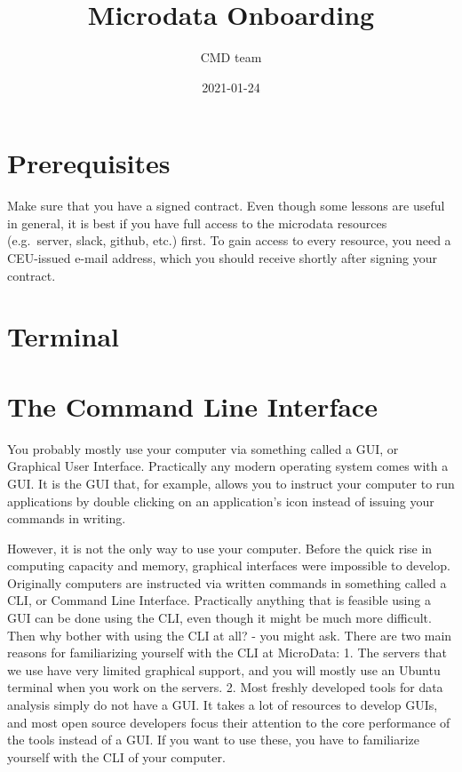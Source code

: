\documentclass[
]{book}
\title{Microdata Onboarding}
\author{CMD team}
\date{2021-01-24}
\begin{document}
\maketitle

{
\setcounter{tocdepth}{1}
\tableofcontents
}
\hypertarget{prerequisites}{%
\chapter{Prerequisites}\label{prerequisites}}

Make sure that you have a signed contract. Even though some lessons are useful in general, it is best if you have full access to the microdata resources (e.g.~server, slack, github, etc.) first. To gain access to every resource, you need a CEU-issued e-mail address, which you should receive shortly after signing your contract.

\hypertarget{terminal}{%
\chapter{Terminal}\label{terminal}}

\hypertarget{the-command-line-interface}{%
\chapter{The Command Line Interface}\label{the-command-line-interface}}

You probably mostly use your computer via something called a GUI, or Graphical User Interface. Practically any modern operating system comes with a GUI. It is the GUI that, for example, allows you to instruct your computer to run applications by double clicking on an application's icon instead of issuing your commands in writing.

However, it is not the only way to use your computer. Before the quick rise in computing capacity and memory, graphical interfaces were impossible to develop. Originally computers are instructed via written commands in something called a CLI, or Command Line Interface. Practically anything that is feasible using a GUI can be done using the CLI, even though it might be much more difficult. Then why bother with using the CLI at all? - you might ask. There are two main reasons for familiarizing yourself with the CLI at MicroData:
1. The servers that we use have very limited graphical support, and you will mostly use an Ubuntu terminal when you work on the servers.
2. Most freshly developed tools for data analysis simply do not have a GUI. It takes a lot of resources to develop GUIs, and most open source developers focus their attention to the core performance of the tools instead of a GUI. If you want to use these, you have to familiarize yourself with the CLI of your computer.
\end{document}
